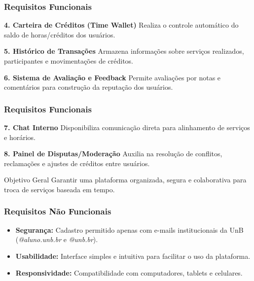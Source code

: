 \documentclass[aspectratio=169]{beamer}
\begin{document}
\begin{frame}
\frametitle{Requisitos Funcionais}

\small

\textbf{4. Carteira de Créditos (Time Wallet)}
Realiza o controle automático do saldo de horas/créditos dos usuários.

\vspace{0.3cm}

\textbf{5. Histórico de Transações}
Armazena informações sobre serviços realizados, participantes e movimentações de créditos.

\vspace{0.3cm}

\textbf{6. Sistema de Avaliação e Feedback}
Permite avaliações por notas e comentários para construção da reputação dos usuários.

\end{frame}


\begin{frame}
\frametitle{Requisitos Funcionais}

\small

\textbf{7. Chat Interno}
Disponibiliza comunicação direta para alinhamento de serviços e horários.

\vspace{0.3cm}

\textbf{8. Painel de Disputas/Moderação}
Auxilia na resolução de conflitos, reclamações e ajustes de créditos entre usuários.

\vspace{0.5cm}

\begin{block}{Objetivo Geral}
Garantir uma plataforma organizada, segura e colaborativa para troca de serviços baseada em tempo.
\end{block}

\end{frame}

\begin{frame}
\frametitle{Requisitos Não Funcionais}

\begin{itemize}
    \item \textbf{Segurança:} Cadastro permitido apenas com e-mails institucionais da UnB (\textit{@aluno.unb.br} e \textit{@unb.br}).

    \item \textbf{Usabilidade:} Interface simples e intuitiva para facilitar o uso da plataforma.

    \item \textbf{Responsividade:} Compatibilidade com computadores, tablets e celulares.
\end{itemize}

\end{frame}
\end{document}
